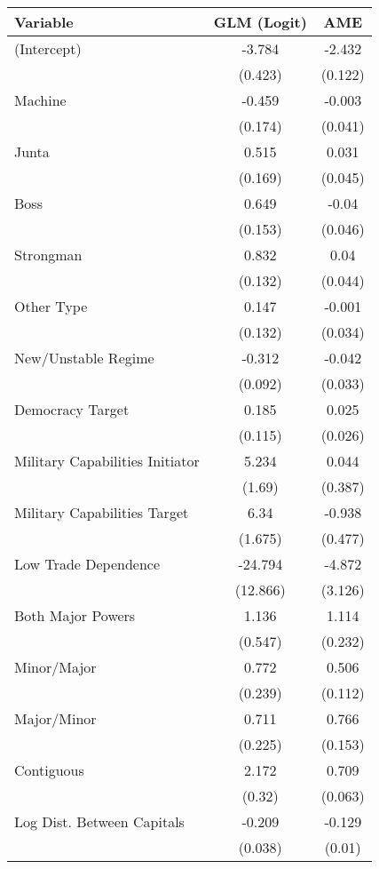 \begin{table}[ht]
\centering
\begingroup\normalsize
\begin{tabular}{lcc}
 Variable & GLM (Logit) & AME \\ 
  \hline
\hline
(Intercept) & -3.784 & -2.432 \\ 
   & (0.423) & (0.122) \\ 
  Machine & -0.459 & -0.003 \\ 
   & (0.174) & (0.041) \\ 
  Junta & 0.515 & 0.031 \\ 
   & (0.169) & (0.045) \\ 
  Boss & 0.649 & -0.04 \\ 
   & (0.153) & (0.046) \\ 
  Strongman & 0.832 & 0.04 \\ 
   & (0.132) & (0.044) \\ 
  Other Type & 0.147 & -0.001 \\ 
   & (0.132) & (0.034) \\ 
  New/Unstable Regime & -0.312 & -0.042 \\ 
   & (0.092) & (0.033) \\ 
  Democracy Target & 0.185 & 0.025 \\ 
   & (0.115) & (0.026) \\ 
  Military Capabilities Initiator & 5.234 & 0.044 \\ 
   & (1.69) & (0.387) \\ 
  Military Capabilities Target  & 6.34 & -0.938 \\ 
   & (1.675) & (0.477) \\ 
  Low Trade Dependence  & -24.794 & -4.872 \\ 
   & (12.866) & (3.126) \\ 
  Both Major Powers & 1.136 & 1.114 \\ 
   & (0.547) & (0.232) \\ 
  Minor/Major & 0.772 & 0.506 \\ 
   & (0.239) & (0.112) \\ 
  Major/Minor & 0.711 & 0.766 \\ 
   & (0.225) & (0.153) \\ 
  Contiguous & 2.172 & 0.709 \\ 
   & (0.32) & (0.063) \\ 
  Log Dist. Between Capitals & -0.209 & -0.129 \\ 
   & (0.038) & (0.01) \\ 

\end{tabular}
\end{table}
